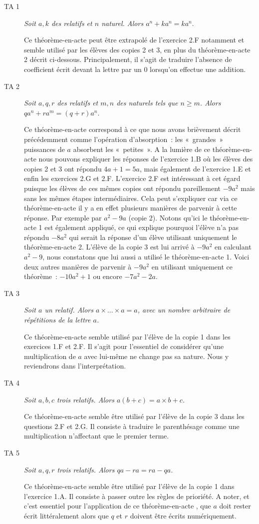 \documentclass{report}
\theoremstyle{definition}
\newcommand{\ta}{théorème-en-acte }
\begin{document}
\begin{description}

\item[TA 1] \textit{Soit $a,k$ des relatifs et $n$ naturel. Alors $a^n+ka^n=ka^n$}.

Ce \ta peut être extrapolé de l'exercice 2.F notamment et semble utilisé par les élèves des copies 2 et 3, en plus du \ta 2 décrit ci-dessous. Principalement, il s'agit de traduire l'absence de coefficient écrit devant la lettre par un 0 lorsqu'on effectue une addition.

\item[TA 2] \textit{Soit $a,q,r$ des relatifs et $m,n$ des naturels tels que $n\ge m$. Alors $qa^n+ra^m=(q+r)a^n$}.

Ce \ta correspond à ce que nous avons brièvement décrit précédemment comme l'opération d'absorption~: les «~grandes~» puissances de $a$ absorbent les «~petites~». A la lumière de ce \ta nous pouvons expliquer les réponses de l'exercice 1.B où les élèves des copies 2 et 3 ont répondu $4a+1=5a$, mais également de l'exercice 1.E et enfin les exercices 2.G et 2.F. L'exercice 2.F est intéressant à cet égard puisque les élèves de ces mêmes copies ont répondu pareillement $-9a^2$ mais sans les mêmes étapes intermédiaires. Cela peut s'expliquer car via ce \ta il y a en effet plusieurs manières de parvenir à cette réponse. Par exemple par $a^2-9a$ (copie 2). Notons qu'ici le \ta 1 est également appliqué, ce qui explique pourquoi l'élève n'a pas répondu $-8a^2$ qui serait la réponse d'un élève utilisant uniquement le \ta 2. L'élève de la copie 3 est lui arrivé à $-9a^2$ en calculant $a^2-9$, nous constatons que lui aussi a utilisé le \ta 1. Voici deux autres manières de parvenir à $-9a^2$ en utilisant uniquement ce théorème~: $-10a^2+1$ ou encore $-7a^2-2a$.

\item[TA 3] \textit{Soit $a$ un relatif. Alors $a\times ...\times a =a $, avec un nombre arbitraire de répétitions de la lettre $a$.}

Ce \ta semble utilisé par l'élève de la copie 1 dans les exercices 1.F et 2.F. Il s'agit pour l'essentiel de considérer qu'une multiplication de $a$ avec lui-même ne change pas sa nature. Nous y reviendrons dans l'interprétation.

\item[TA 4] \textit{Soit $a,b,c$ trois relatifs. Alors $a(b+c)=a\times b + c$.}

Ce \ta semble être utilisé par l'élève de la copie 3 dans les questions 2.F et 2.G. Il consiste à traduire le parenthésage comme une multiplication n'affectant que le premier terme.

\item[TA 5] \textit{Soit $a,q,r$ trois relatifs. Alors $qa-ra=ra-qa$.}

Ce \ta semble être utilisé par l'élève de la copie 1 dans l'exercice 1.A. Il consiste à passer outre les règles de prioriété. A noter, et c'est essentiel pour l'application de ce \ta, que $a$ doit rester écrit littéralement alors que $q$ et $r$ doivent être écrits numériquement.

\end{description}
\end{document}
